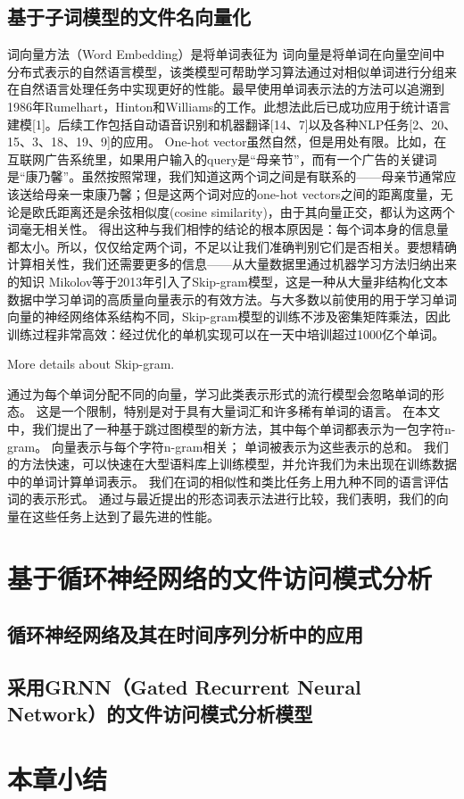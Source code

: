 \subsection{基于子词模型的文件名向量化}
词向量方法（Word Embedding）是将单词表征为
词向量是将单词在向量空间中分布式表示的自然语言模型，该类模型可帮助学习算法通过对相似单词进行分组来在自然语言处理任务中实现更好的性能。{\color{orange}最早使用单词表示法的方法可以追溯到1986年Rumelhart，Hinton和Williams的工作}。此想法此后已成功应用于统计语言建模[1]。后续工作包括自动语音识别和机器翻译[14、7]以及各种NLP任务[2、20、15、3、18、19、9]的应用。
One-hot vector虽然自然，但是用处有限。比如，在互联网广告系统里，如果用户输入的query是“母亲节”，而有一个广告的关键词是“康乃馨”。虽然按照常理，我们知道这两个词之间是有联系的——母亲节通常应该送给母亲一束康乃馨；但是这两个词对应的one-hot vectors之间的距离度量，无论是欧氏距离还是余弦相似度(cosine similarity)，由于其向量正交，都认为这两个词毫无相关性。 得出这种与我们相悖的结论的根本原因是：每个词本身的信息量都太小。所以，仅仅给定两个词，不足以让我们准确判别它们是否相关。要想精确计算相关性，我们还需要更多的信息——从大量数据里通过机器学习方法归纳出来的知识
Mikolov等于2013年引入了Skip-gram模型，这是一种从大量非结构化文本数据中学习单词的高质量向量表示的有效方法。与大多数以前使用的用于学习单词向量的神经网络体系结构不同，Skip-gram模型的训练不涉及密集矩阵乘法，因此训练过程非常高效：经过优化的单机实现可以在一天中培训超过1000亿个单词。

{\color{red}More details about Skip-gram.}

{\color{orange}通过为每个单词分配不同的向量，学习此类表示形式的流行模型会忽略单词的形态。 这是一个限制，特别是对于具有大量词汇和许多稀有单词的语言。 在本文中，我们提出了一种基于跳过图模型的新方法，其中每个单词都表示为一包字符n-gram。 向量表示与每个字符n-gram相关； 单词被表示为这些表示的总和。 我们的方法快速，可以快速在大型语料库上训练模型，并允许我们为未出现在训练数据中的单词计算单词表示。 我们在词的相似性和类比任务上用九种不同的语言评估词的表示形式。 通过与最近提出的形态词表示法进行比较，我们表明，我们的向量在这些任务上达到了最先进的性能。}

\section{基于循环神经网络的文件访问模式分析}
\subsection{循环神经网络及其在时间序列分析中的应用}
\subsection{采用GRNN（Gated Recurrent Neural Network）的文件访问模式分析模型}
\section{本章小结}